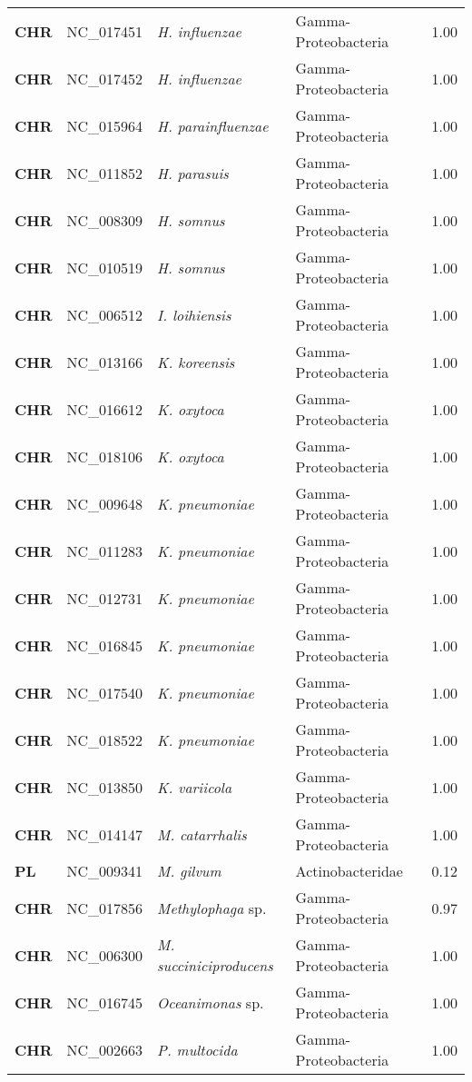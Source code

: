 \begin{adjustwidth}{-3cm}{2cm}
{\begin{supertabular}{>{\bfseries}l|p{0.1\textwidth}p{0.14\textwidth}l|l}
CHR & NC\_017451 & \textit{H. influenzae} & Gamma-Proteobacteria & 1.00\\
CHR & NC\_017452 & \textit{H. influenzae} & Gamma-Proteobacteria & 1.00\\
CHR & NC\_015964 & \textit{H. parainfluenzae} & Gamma-Proteobacteria & 1.00\\
CHR & NC\_011852 & \textit{H. parasuis} & Gamma-Proteobacteria & 1.00\\
CHR & NC\_008309 & \textit{H. somnus} & Gamma-Proteobacteria & 1.00\\
CHR & NC\_010519 & \textit{H. somnus} & Gamma-Proteobacteria & 1.00\\
CHR & NC\_006512 & \textit{I. loihiensis} & Gamma-Proteobacteria & 1.00\\
CHR & NC\_013166 & \textit{K. koreensis} & Gamma-Proteobacteria & 1.00\\
CHR & NC\_016612 & \textit{K. oxytoca} & Gamma-Proteobacteria & 1.00\\
CHR & NC\_018106 & \textit{K. oxytoca} & Gamma-Proteobacteria & 1.00\\
CHR & NC\_009648 & \textit{K. pneumoniae} & Gamma-Proteobacteria & 1.00\\
CHR & NC\_011283 & \textit{K. pneumoniae} & Gamma-Proteobacteria & 1.00\\
CHR & NC\_012731 & \textit{K. pneumoniae} & Gamma-Proteobacteria & 1.00\\
CHR & NC\_016845 & \textit{K. pneumoniae} & Gamma-Proteobacteria & 1.00\\
CHR & NC\_017540 & \textit{K. pneumoniae} & Gamma-Proteobacteria & 1.00\\
CHR & NC\_018522 & \textit{K. pneumoniae} & Gamma-Proteobacteria & 1.00\\
CHR & NC\_013850 & \textit{K. variicola} & Gamma-Proteobacteria & 1.00\\
CHR & NC\_014147 & \textit{M. catarrhalis} & Gamma-Proteobacteria & 1.00\\
PL & NC\_009341 & \textit{M. gilvum} & Actinobacteridae & 0.12\\
CHR & NC\_017856 & \textit{Methylophaga} sp. & Gamma-Proteobacteria & 0.97\\
CHR & NC\_006300 & \textit{M. succiniciproducens} & Gamma-Proteobacteria & 1.00\\
CHR & NC\_016745 & \textit{Oceanimonas} sp. & Gamma-Proteobacteria & 1.00\\
CHR & NC\_002663 & \textit{P. multocida} & Gamma-Proteobacteria & 1.00\\

\end{supertabular}}
\end{adjustwidth}
